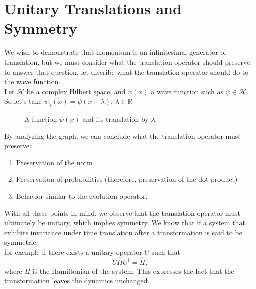 \documentclass{article}
\begin{document}
\section{\textbf{Unitary Translations and Symmetry}}

We wish to demonstrate that momentum is an infinitesimal generator of translation, but we must consider what the translation operator should preserve, to answer that question, let discribe what the translation operator should do to the wave function.\\

Let $\mathcal{H}$ be a complex Hilbert space, and $\psi(x)$ a wave function such as $\psi \in \mathcal{H}$. So let's take $\psi_{\lambda}(x) = \psi(x - \lambda) $, $\lambda \in \mathbb{R}$

\begin{figure}[ht]
	\centering
	\caption{A function $\psi(x)$ and its translation by $\lambda$.}
\end{figure}
\vspace{0.5cm}

By analyzing the graph, we can conclude what the translation operator must preserve:
\begin{enumerate}
	\item Preservation of the norm
	\item Preservation of probabilities (therefore, preservation of the dot product)
	\item Behavior similar to the evolution operator.
\end{enumerate}

With all these points in mind, we observe that the translation operator must ultimately be unitary, which implies symmetry.
We know that if a system that exhibits invariance under time translation after a transformation is said to be symmetric.\\
for exemple if there exists a unitary operator $U$ such that
$$
U \hat{H} U^\dagger = \hat{H},
$$
where $H$ is the Hamiltonian of the system. This expresses the fact that the transformation leaves the dynamics unchanged.
\end{document}
